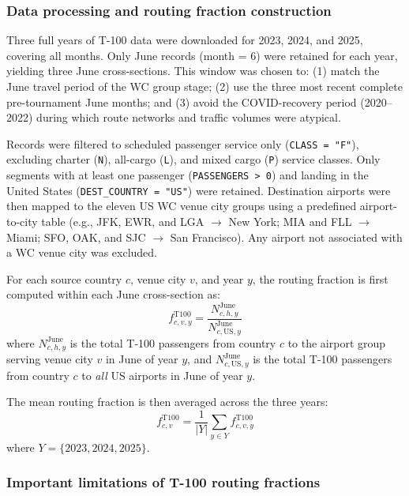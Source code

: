 \documentclass[12pt]{article}
\begin{document}
\subsubsection*{Data processing and routing fraction construction}

Three full years of T-100 data were downloaded for 2023, 2024, and
2025, covering all months. Only June records (month = 6) were
retained for each year, yielding three June cross-sections. This
window was chosen to: (1) match the June travel period of the WC
group stage; (2) use the three most recent complete pre-tournament
June months; and (3) avoid the COVID-recovery period (2020--2022)
during which route networks and traffic volumes were atypical.

Records were filtered to scheduled passenger service only
(\texttt{CLASS = "F"}), excluding charter (\texttt{N}),
all-cargo (\texttt{L}), and mixed cargo (\texttt{P}) service
classes. Only segments with at least one passenger (\texttt{PASSENGERS > 0})
and landing in the United States (\texttt{DEST\_COUNTRY = "US"}) were
retained. Destination airports were then mapped to the eleven US
WC venue city groups using a predefined airport-to-city table (e.g.,
JFK, EWR, and LGA $\to$ New York; MIA and FLL $\to$ Miami;
SFO, OAK, and SJC $\to$ San Francisco). Any airport not associated
with a WC venue city was excluded.

For each source country $c$, venue city $v$, and year $y$, the
routing fraction is first computed within each June cross-section
as:
\begin{equation}
  f_{c,v,y}^{\text{T100}} =
    \frac{N_{c,h,y}^{\text{June}}}
         {N_{c,\text{US},y}^{\text{June}}}
\end{equation}
where $N_{c,h,y}^{\text{June}}$ is the total T-100 passengers from
country $c$ to the airport group serving venue city $v$ in June of
year $y$, and $N_{c,\text{US},y}^{\text{June}}$ is the total T-100
passengers from country $c$ to \emph{all} US airports in June of
year $y$.

The mean routing fraction is then averaged across the three years:
\begin{equation}
  f_{c,v}^{\text{T100}} = \frac{1}{|Y|}
    \sum_{y \in Y} f_{c,v,y}^{\text{T100}}
  \label{eq:t100_routing}
\end{equation}
where $Y = \{2023, 2024, 2025\}$.

\subsubsection*{Important limitations of T-100 routing fractions}
\end{document}
